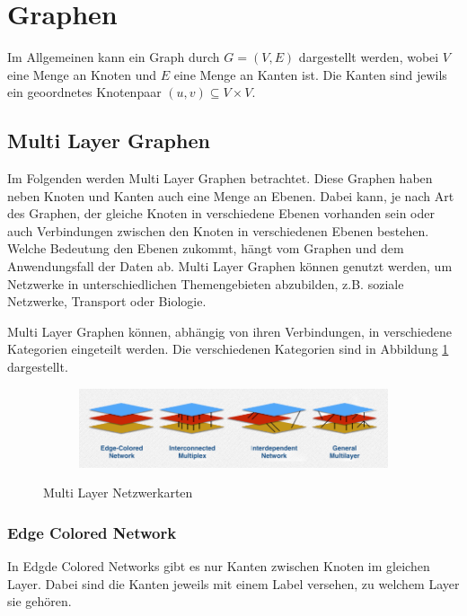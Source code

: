 \section{Graphen}


Im Allgemeinen kann ein Graph durch $G = (V, E)$ dargestellt werden, wobei $V$ eine Menge an Knoten und $E$ eine Menge an Kanten ist. Die Kanten sind jewils ein geoordnetes Knotenpaar $(u, v) \subseteq V \times V$.

\subsection{Multi Layer Graphen}

Im Folgenden werden Multi Layer Graphen betrachtet. Diese Graphen haben neben Knoten und Kanten auch eine Menge an Ebenen. Dabei kann, je nach Art des Graphen, der gleiche Knoten in verschiedene Ebenen vorhanden sein oder auch Verbindungen zwischen den Knoten in verschiedenen Ebenen bestehen.
Welche Bedeutung den Ebenen zukommt, hängt vom Graphen und dem Anwendungsfall der Daten ab. Multi Layer Graphen können genutzt werden, um Netzwerke in unterschiedlichen Themengebieten abzubilden, z.B. soziale Netzwerke, Transport oder Biologie.

Multi Layer Graphen können, abhängig von ihren Verbindungen, in verschiedene Kategorien eingeteilt werden. Die verschiedenen Kategorien sind in Abbildung \ref{network_types} dargestellt. 

\begin{figure}
  \centering
  \begin{subfigure}[b]{1.0\textwidth}
    \includegraphics[width=1.0\linewidth]{img/network_types.png}
  \end{subfigure}
  \caption{Multi Layer Netzwerkarten}
  \label{network_types}
\end{figure}

\subsubsection{Edge Colored Network}

In Edgde Colored Networks gibt es nur Kanten zwischen Knoten im gleichen Layer. Dabei sind die Kanten jeweils mit einem Label versehen, zu welchem Layer sie gehören.


